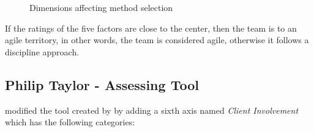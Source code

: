 \begin{figure}[H]
{\caption{Dimensions affecting method selection} 
\label{fig:boehm_turner_5axes}}
\end{figure}

If the ratings of the five factors are close to the center, then the team is to an agile territory, in other words, the team is considered agile, otherwise it follows a discipline approach.

\subsection{Philip Taylor - Assessing Tool} 
\citet{taylor} modified the tool created by \citet{1231450} by adding a sixth axis named \textit{Client Involvement} which has the following categories:

